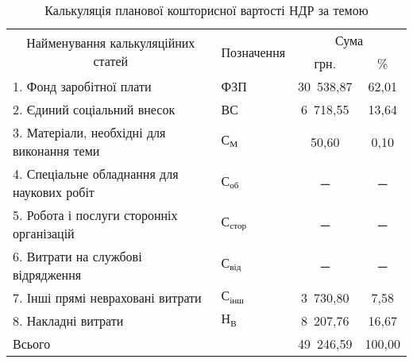 \begin{table}[H]
\centering
\caption{Калькуляція планової кошторисної вартості НДР за темою}
\label{tab:plan_calculation}
\begin{tabular}{|l|l|c|c|}
\hline
\multicolumn{1}{|c|}{\multirow{2}{*}{Найменування калькуляційних статей}} & \multicolumn{1}{c|}{\multirow{2}{*}{Позначення}} & \multicolumn{2}{c|}{Сума} \\ \cline{3-4}
\multicolumn{1}{|c|}{} & \multicolumn{1}{c|}{} & грн. & \% \\ \hline
  1. Фонд заробітної плати & ФЗП & 30~538,87 & 62,01 \\ \hline
  2. Єдиний соціальний внесок & ВС & 6~718,55 & 13,64 \\ \hline
  3. Матеріали, необхідні для виконання теми & $\text{С}_{\text{М}}$ & 50,60 & 0,10 \\ \hline
  4. Спеціальне обладнання для наукових робіт & $\text{С}_{\text{об}}$ & ─ & ─ \\ \hline
  5. Робота і послуги сторонніх організацій & $\text{С}_{\text{стор}}$ & ─ & ─ \\ \hline
  6. Витрати на службові відрядження & $\text{С}_{\text{від}}$ & ─ & ─ \\ \hline
  7. Інші прямі невраховані витрати & $\text{С}_{\text{інш}}$ & 3~730,80 & 7,58 \\ \hline
  8. Накладні витрати & $\text{Н}_{\text{В}}$ & 8~207,76 & 16,67 \\ \hline
\multicolumn{2}{|l|}{Всього} & 49~246,59 & 100,00 \\
\hline
\end{tabular}
\end{table}
